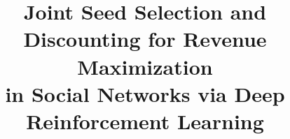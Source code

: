 \documentclass[sigconf,review,anonymous]{acmart}
\title{Joint Seed Selection and Discounting for Revenue Maximization\\
       in Social Networks via Deep Reinforcement Learning}
\begin{document}
\begin{abstract}

\end{abstract}

\maketitle
















%
\end{document}
